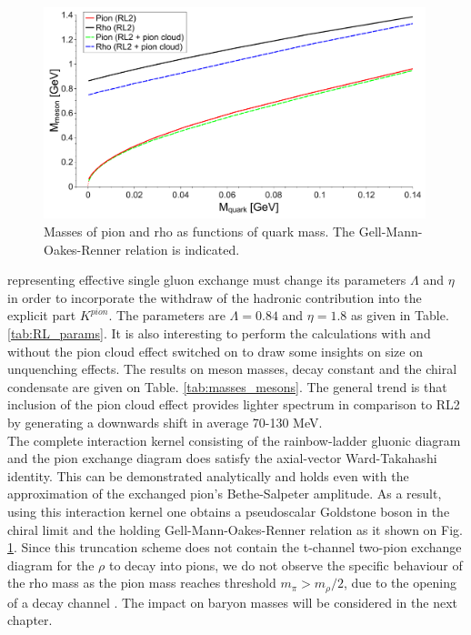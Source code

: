 \begin{figure}[!h]
\begin{center}
\includegraphics[width=0.99\textwidth]{figures/GMOR_Pi} 
\caption{\footnotesize Masses of pion and rho as functions of quark mass. The Gell-Mann-Oakes-Renner relation is indicated. }\label{fig:GMOR}
\end{center}
\end{figure}
representing effective single gluon exchange must change its parameters $\Lambda$ and $\eta$ in order to incorporate the withdraw of the hadronic contribution into the explicit part $ K^{pion}$. 
The parameters are $\Lambda=0.84$ and $\eta=1.8$ as given in Table. \ref{tab:RL_params}. It is also interesting to perform the calculations with and without the pion cloud effect switched on to draw some insights on size on unquenching effects. The results on meson masses, decay constant and the chiral condensate are given on Table. \ref{tab:masses_mesons}. The general trend is that inclusion of the pion cloud effect provides lighter spectrum in comparison to RL2 by generating a downwards shift in average 70-130 MeV.  \\

The complete interaction kernel consisting of
the rainbow-ladder gluonic diagram and the pion exchange diagram does
satisfy the axial-vector Ward-Takahashi identity. This can be demonstrated 
analytically \cite{Fischer:2007ze,Fischer:2008wy} and holds even with the
approximation of the exchanged pion's Bethe-Salpeter amplitude. As a result,
using this interaction kernel one obtains a pseudoscalar Goldstone boson
in the chiral limit and the holding Gell-Mann-Oakes-Renner relation \cite{Fischer:2007ze,Fischer:2008wy} as it shown on Fig. \ref{fig:GMOR}. 
Since this truncation scheme does not contain the t-channel two-pion exchange diagram for the $\rho$ to decay into pions, we do not observe
the specific behaviour of the rho mass as the pion mass reaches threshold $m_\pi>m_\rho/2$, due to the opening of a decay channel \cite{Allton:2005fb}. The impact on baryon masses will be considered in the next chapter. \\

